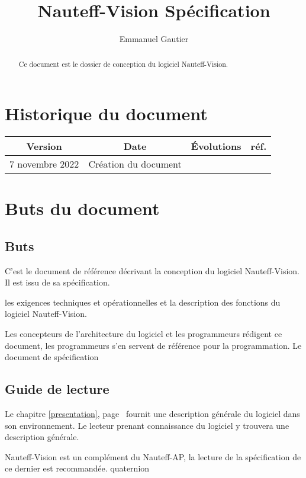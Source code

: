 \documentclass[a4paper,11pt]{report}
\title{Nauteff-Vision Spécification}
\author{Emmanuel Gautier}
\begin{document}
\maketitle

\begin{abstract}
Ce document est le dossier de conception du logiciel Nauteff-Vision.
\end{abstract}

\chapter*{Historique du document}
\begin{tabular}{|c|c|c|c|}
	\hline 
	Version & Date & Évolutions & réf. \\ 
	\hline 
	7 novembre 2022 & Création du document  &  &  \\ 
	\hline 
\end{tabular} 
\tableofcontents

\chapter{Buts du document}
\section{Buts}

C'est le document de référence décrivant
la conception du logiciel Nauteff-Vision.
Il est issu de sa spécification.

les exigences techniques et opérationnelles et la description
des fonctions du logiciel Nauteff-Vision.

Les concepteurs de l'architecture du logiciel et les programmeurs
rédigent ce document, les programmeurs s'en servent de référence pour
la programmation. Le document de spécification 

\section{Guide de lecture}


Le chapitre \ref{presentation}, page\ \pageref{presentation} fournit une description générale du logiciel
dans son environnement. Le lecteur prenant connaissance du logiciel
y trouvera une description générale.

Nauteff-Vision est un complément du Nauteff-AP,
la lecture de la spécification de ce dernier est recommandée.
\Gls{quaternion}
\end{document}
